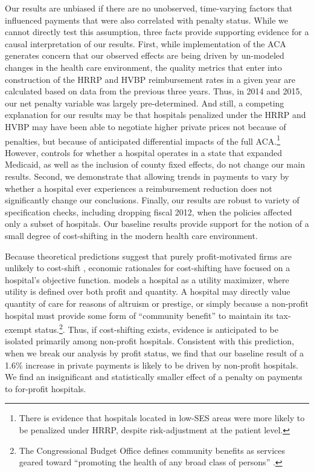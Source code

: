 \documentclass[12pt]{article}
\begin{document}
Our results are unbiased if there are no unobserved, time-varying factors that influenced payments that were also correlated with penalty status.  While we cannot directly test this assumption, three facts provide supporting evidence for a causal interpretation of our results.  First, while implementation of the ACA generates concern that our observed effects are being driven by un-modeled changes in the health care environment, the quality metrics that enter into construction of the HRRP and HVBP reimbursement rates in a given year are calculated based on data from the previous three years.  Thus, in 2014 and 2015, our net penalty variable was largely pre-determined.  And still, a competing explanation for our results may be that hospitals penalized under the HRRP and HVBP may have been able to negotiate higher private prices not because of penalties, but because of anticipated differential impacts of the full ACA.\footnote{There is evidence that hospitals located in low-SES areas were more likely to be penalized under HRRP, despite risk-adjustment at the patient level.}  However, controls for whether a hospital operates in a state that expanded Medicaid, as well as the inclusion of county fixed effects, do not change our main results.   Second, we demonstrate that allowing trends in payments to vary by whether a hospital ever experiences a reimbursement reduction does not significantly change our conclusions.  Finally, our results are robust to variety of specification checks, including dropping fiscal 2012, when the policies affected only a subset of hospitals.  Our baseline results provide support for the notion of a small degree of cost-shifting in the modern health care environment.  

Because theoretical predictions suggest that purely profit-motivated firms are unlikely to cost-shift \citep{hay1983}, economic rationales for cost-shifting have focused on a hospital's objective function.  \cite{dranove1988} models a hospital as a utility maximizer, where utility is defined over both profit and quantity.  A hospital may directly value quantity of care for reasons of altruism or prestige, or simply because a non-profit hospital must provide some form of ``community benefit'' to maintain its tax-exempt status.\footnote{The Congressional Budget Office defines community benefits as services geared toward ``promoting the health of any broad class of persons'' \citep{cbo2006}.}.  Thus, if cost-shifting exists, evidence is anticipated to be isolated primarily among non-profit hospitals. Consistent with this prediction, when we break our analysis by profit status, we find that our baseline result of a 1.6$\%$ increase in private payments is likely to be driven by non-profit hospitals.  We find an insignificant and statistically smaller effect of a penalty on payments to for-profit hospitals.    
\end{document}
